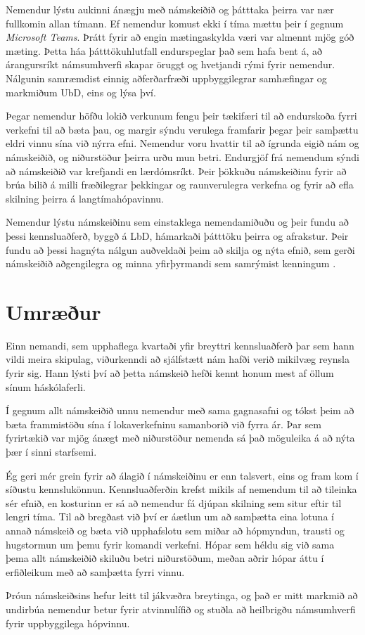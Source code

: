 \documentclass{kennsluakademia_conf}
\begin{document}
Nemendur lýstu aukinni ánægju með námskeiðið og þátttaka þeirra var nær fullkomin allan tímann. Ef nemendur komust ekki í tíma mættu þeir í gegnum \textit{Microsoft Teams}. Þrátt fyrir að engin mætingaskylda væri var almennt mjög góð mæting. Þetta háa þátttökuhlutfall endurspeglar það sem \cite{freeman2007sense} hafa bent á, að árangursríkt námsumhverfi skapar öruggt og hvetjandi rými fyrir nemendur. Nálgunin samræmdist einnig aðferðarfræði uppbyggilegrar samhæfingar og markmiðum UbD, eins og \cite{biggs_constructive, biggs_university} lýsa því.

Þegar nemendur höfðu lokið verkunum fengu þeir tækifæri til að endurskoða fyrri verkefni til að bæta þau, og margir sýndu verulega framfarir þegar þeir samþættu eldri vinnu sína við nýrra efni. Nemendur voru hvattir til að ígrunda eigið nám og námskeiðið, og niðurstöður þeirra urðu mun betri. Endurgjöf frá nemendum sýndi að námskeiðið var krefjandi en lærdómsríkt. Þeir þökkuðu námskeiðinu fyrir að brúa bilið á milli fræðilegrar þekkingar og raunverulegra verkefna og fyrir að efla skilning þeirra á langtímahópavinnu.

Nemendur lýstu námskeiðinu sem einstaklega nemendamiðuðu og þeir fundu að þessi kennsluaðferð, byggð á LbD, hámarkaði þátttöku þeirra og afrakstur. Þeir fundu að þessi hagnýta nálgun auðveldaði þeim að skilja og nýta efnið, sem gerði námskeiðið aðgengilegra og minna yfirþyrmandi sem samrýmist kenningum \cite{kolb1984experiential}.


\section{Umræður}

Einn nemandi, sem upphaflega kvartaði yfir breyttri kennsluaðferð þar sem hann vildi meira skipulag, viðurkenndi að sjálfstætt nám hafði verið mikilvæg reynsla fyrir sig. Hann lýsti því að þetta námskeið hefði kennt honum mest af öllum sínum háskólaferli.

Í gegnum allt námskeiðið unnu nemendur með sama gagnasafni og tókst þeim að bæta frammistöðu sína í lokaverkefninu samanborið við fyrra ár. Þar sem fyrirtækið var mjög ánægt með niðurstöður nemenda sá það möguleika á að nýta þær í sinni starfsemi. 

Ég geri mér grein fyrir að álagið í námskeiðinu er enn talsvert, eins og fram kom í síðustu kennslukönnun. Kennsluaðferðin krefst mikils af nemendum til að tileinka sér efnið, en kosturinn er sá að nemendur fá djúpan skilning sem situr eftir til lengri tíma.
Til að bregðast við því er áætlun um að samþætta eina lotuna í annað námskeið og bæta við upphafslotu sem miðar að hópmyndun, trausti og hugstormun um þemu fyrir komandi verkefni. Hópar sem héldu sig við sama þema allt námskeiðið skiluðu betri niðurstöðum, meðan aðrir hópar áttu í erfiðleikum með að samþætta fyrri vinnu.

Þróun námskeiðsins hefur leitt til jákvæðra breytinga, og það er mitt markmið að undirbúa nemendur betur fyrir atvinnulífið og stuðla að heilbrigðu námsumhverfi fyrir uppbyggilega hópvinnu.

  
  
\end{document}

